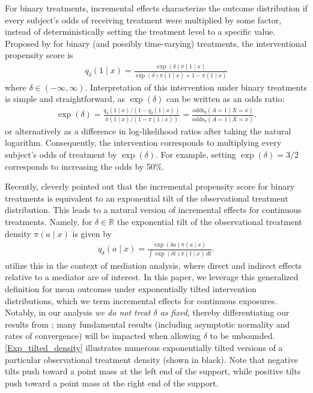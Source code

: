 \documentclass[11pt,twoside]{article}
\theoremstyle{definition}
\theoremstyle{remark}
\begin{document}
For binary treatments, incremental effects characterize the outcome distribution if every subject's odds of receiving treatment were multiplied by some factor, instead of deterministically setting the treatment level to a specific value. Proposed by \cite{kennedy2019nonparametric} for binary (and possibly time-varying) treatments, the interventional propensity score is
\begin{align*}
     q_\delta(1 \mid x) = \frac{\exp(\delta) \pi(1 \mid x)}{\exp(\delta) \pi(1 \mid x) + 1-\pi(1 \mid x)}
\end{align*}
where $\delta \in (-\infty, \infty)$. Interpretation of this intervention under binary treatments is simple and straightforward, as $\exp(\delta)$ can be written as an odds ratio:
\begin{align*}
    \exp(\delta) = \frac{q_\delta(1 \mid x)/(1 - q_\delta(1 \mid x))}{\pi(1 \mid x)/(1 - \pi(1 \mid x))} = \frac{\text{odds}_q(A = 1 \mid X = x)}{\text{odds}_\pi(A = 1 \mid X = x)}.
\end{align*}
or alternatively as a difference in log-likelihood ratios after taking the natural logarithm. Consequently, the intervention corresponds to multiplying every subject's odds of treatment by $\exp(\delta)$. For example, setting $\exp(\delta) = 3/2$ corresponds to increasing the odds by 50\%. 

Recently, \cite{diaz2020causal} cleverly pointed out that the incremental propensity score for binary treatments is equivalent to an exponential tilt of the observational treatment distribution. This leads to a  natural version of incremental effects for continuous treatments. Namely, for $\delta \in \mathbb{R}$ the exponential tilt of the observational treatment density $\pi(a \mid x)$ is given by
\begin{align} \label{q_definition}
    q_\delta(a \mid x) = \frac{\exp(\delta a) \pi(a \mid x)}{\int \exp(\delta t) \pi(t \mid x) \, dt}. 
\end{align}
 \cite{diaz2020causal} utilize this in the context of mediation analysis, where direct and indirect effects relative to a mediator are of interest. In this paper, we leverage this generalized definition for mean outcomes under exponentially tilted intervention distributions, which we term incremental effects for continuous exposures. Notably, in our analysis \textit{we do not treat $\delta$ as fixed}, thereby differentiating our results from \cite{diaz2020causal}; many fundamental results (including asymptotic normality and rates of convergence) will be impacted when allowing $\delta$ to be unbounded. \cref{Exp_tilted_density} illustrates numerous exponentially tilted versions of a particular observational treatment density (shown in black). Note that negative tilts push toward a point mass at the left end of the support, while positive tilts push toward a point mass at the right end of the support.
\end{document}
